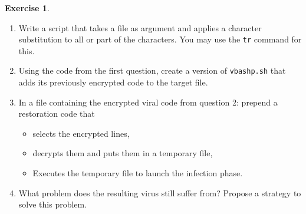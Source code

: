 \documentclass[a4paper,11pt]{article}
\theoremstyle{plain}
\theoremstyle{definition}
\newtheorem{exercice}{Exercise}
\begin{document}
\begin{exercice}

\begin{enumerate}
\item Write a script that takes a file as argument and applies a character substitution to all or part of the characters.
You may use the \texttt{tr} command for this.
\item Using the code from the first question, create a version of \texttt{vbashp.sh} that adds its previously encrypted code to the target file.
\item In a file containing the encrypted viral code from question 2: prepend a restoration code that 
\begin{itemize}
\item selects the encrypted lines, 
\item decrypts them and puts them in a temporary file,
\item Executes the temporary file to launch the infection phase.
\end{itemize}
\item What problem does the resulting virus still suffer from? Propose a strategy to solve this problem.
\end{enumerate}

\end{exercice}
\end{document}
